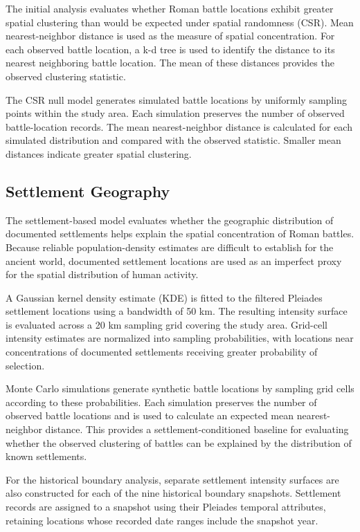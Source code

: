 \documentclass[
  letterpaper,
  DIV=11,
  numbers=noendperiod]{scrartcl}
\begin{document}
The initial analysis evaluates whether Roman battle locations exhibit
greater spatial clustering than would be expected under spatial
randomness (CSR). Mean nearest-neighbor distance is used as the measure
of spatial concentration. For each observed battle location, a k-d tree
is used to identify the distance to its nearest neighboring battle
location. The mean of these distances provides the observed clustering
statistic.

The CSR null model generates simulated battle locations by uniformly
sampling points within the study area. Each simulation preserves the
number of observed battle-location records. The mean nearest-neighbor
distance is calculated for each simulated distribution and compared with
the observed statistic. Smaller mean distances indicate greater spatial
clustering.

\subsection{Settlement Geography}\label{settlement-geography}

The settlement-based model evaluates whether the geographic distribution
of documented settlements helps explain the spatial concentration of
Roman battles. Because reliable population-density estimates are
difficult to establish for the ancient world, documented settlement
locations are used as an imperfect proxy for the spatial distribution of
human activity.

A Gaussian kernel density estimate (KDE) is fitted to the filtered
Pleiades settlement locations using a bandwidth of 50 km. The resulting
intensity surface is evaluated across a 20 km sampling grid covering the
study area. Grid-cell intensity estimates are normalized into sampling
probabilities, with locations near concentrations of documented
settlements receiving greater probability of selection.

Monte Carlo simulations generate synthetic battle locations by sampling
grid cells according to these probabilities. Each simulation preserves
the number of observed battle locations and is used to calculate an
expected mean nearest-neighbor distance. This provides a
settlement-conditioned baseline for evaluating whether the observed
clustering of battles can be explained by the distribution of known
settlements.

For the historical boundary analysis, separate settlement intensity
surfaces are also constructed for each of the nine historical boundary
snapshots. Settlement records are assigned to a snapshot using their
Pleiades temporal attributes, retaining locations whose recorded date
ranges include the snapshot year.
\end{document}
